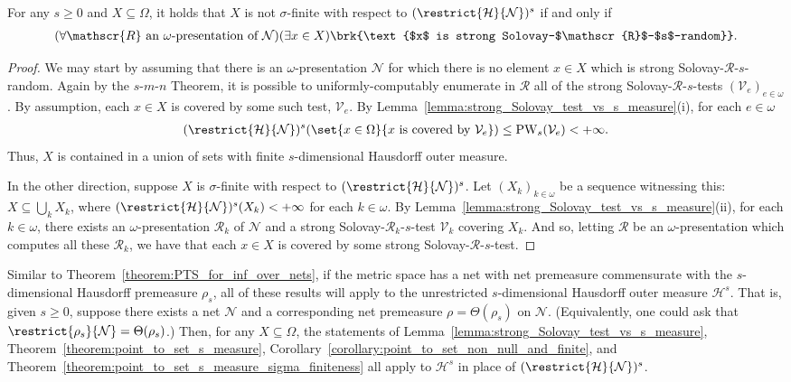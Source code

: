 \begin{theorem}
    \label{theorem:point_to_set_s_measure_sigma_finiteness}
    For any $s \geq 0$ and $X \subseteq \Omega$, it holds that $X$ is not $\sigma$-finite with respect to $(\restrict{\mathcal{H}}{\mathcal{N}})^s$ if and only if
    \begin{align*}
        (\forall \mathscr{R} \text{ an $\omega$-presentation of $\mathcal{N}$})(\exists x \in X) \brk{\text{$x$ 
 is strong Solovay-$\mathscr{R}$-$s$-random}}.
    \end{align*}
\end{theorem}
\begin{proof}
    We may start by assuming that there is an $\omega$-presentation $\mathcal{N}$ for which there is no element $x \in X$ which is strong Solovay-$\mathscr{R}$-$s$-random. Again by the $s$-$m$-$n$ Theorem, it is possible to uniformly-computably enumerate in $\mathscr{R}$ all of the strong Solovay-$\mathscr{R}$-$s$-tests $(\mathcal{V}_e)_{e \in \omega}$. By assumption, each $x \in X$ is covered by some such test, $\mathcal{V}_e$. By Lemma~\ref{lemma:strong_Solovay_test_vs_s_measure}(i), for each $e \in \omega$
    \begin{align*}
        (\restrict{\mathcal{H}}{\mathcal{N}})^s(\set{x \in \Omega}{x \text{ is covered by } \mathcal{V}_e}) \leq \operatorname{PW}_s(\mathcal{V}_e) < + \infty.
    \end{align*}
    Thus, $X$ is contained in a union of sets with finite $s$-dimensional Hausdorff outer measure. 

    In the other direction, suppose $X$ is $\sigma$-finite with respect to $(\restrict{\mathcal{H}}{\mathcal{N}})^s$. Let $(X_k)_{k \in \omega}$ be a sequence witnessing this: $X \subseteq \bigcup_k X_k$, where $(\restrict{\mathcal{H}}{\mathcal{N}})^s(X_k) < + \infty$ for each $k \in \omega$. By Lemma~\ref{lemma:strong_Solovay_test_vs_s_measure}(ii), for each $k \in \omega$, there exists an $\omega$-presentation $\mathscr{R}_k$ of $\mathcal{N}$ and a strong Solovay-$\mathscr{R}_k$-$s$-test $\mathcal{V}_k$ covering $X_k$. And so, letting $\mathscr{R}$ be an $\omega$-presentation which computes all these $\mathscr{R}_k$, we have that each $x \in X$ is covered by some strong Solovay-$\mathscr{R}$-$s$-test.  
\end{proof}

Similar to Theorem~\ref{theorem:PTS_for_inf_over_nets}, if the metric space has a net with net premeasure commensurate with the $s$-dimensional Hausdorff premeasure $\rho_s$, all of these results will apply to the unrestricted $s$-dimensional Hausdorff outer measure $\mathcal{H}^s$. That is, given $s \geq 0$, suppose there exists a net $\mathcal{N}$ and a corresponding net premeasure $\rho = \Theta(\rho_s)$ on $\mathcal{N}$. (Equivalently, one could ask that $\restrict{\rho_s}{\mathcal{N}} = \Theta(\rho_s)$.) Then, for any $X \subseteq \Omega$, the statements of Lemma~\ref{lemma:strong_Solovay_test_vs_s_measure}, Theorem~\ref{theorem:point_to_set_s_measure}, Corollary~\ref{corollary:point_to_set_non_null_and_finite}, and Theorem~\ref{theorem:point_to_set_s_measure_sigma_finiteness} all apply to $\mathcal{H}^s$ in place of $(\restrict{\mathcal{H}}{\mathcal{N}})^s$. 

